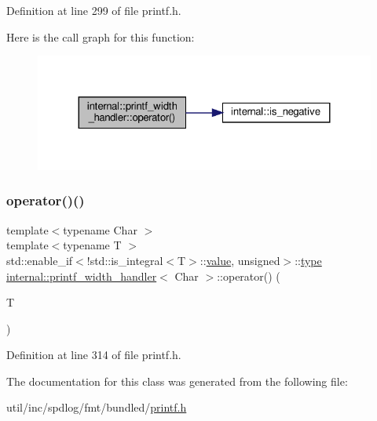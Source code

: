 Definition at line 299 of file printf.\+h.

Here is the call graph for this function\+:
\nopagebreak
\begin{figure}[H]
\begin{center}
\leavevmode
\includegraphics[width=324pt]{classinternal_1_1printf__width__handler_a5d2d31824dda4ca908be49b6c673a965_cgraph}
\end{center}
\end{figure}
\mbox{\label{classinternal_1_1printf__width__handler_a8073d9a0c8acb3fade46decf3bf484f9}} 
\subsubsection{\texorpdfstring{operator()()}{operator()()}\hspace{0.1cm}{\footnotesize\ttfamily [2/2]}}
{\footnotesize\ttfamily template$<$typename Char $>$ \\
template$<$typename T $>$ \\
std\+::enable\+\_\+if$<$!std\+::is\+\_\+integral$<$T$>$\+::\hyperlink{classinternal_1_1value}{value}, unsigned$>$\+::\hyperlink{namespaceinternal_a8661864098ac0acff9a6dd7e66f59038}{type} \hyperlink{classinternal_1_1printf__width__handler}{internal\+::printf\+\_\+width\+\_\+handler}$<$ Char $>$\+::operator() (\begin{DoxyParamCaption}\item[{T}]{ }\end{DoxyParamCaption})\hspace{0.3cm}{\ttfamily [inline]}}



Definition at line 314 of file printf.\+h.



The documentation for this class was generated from the following file\+:\begin{DoxyCompactItemize}
\item 
util/inc/spdlog/fmt/bundled/\hyperlink{printf_8h}{printf.\+h}\end{DoxyCompactItemize}
